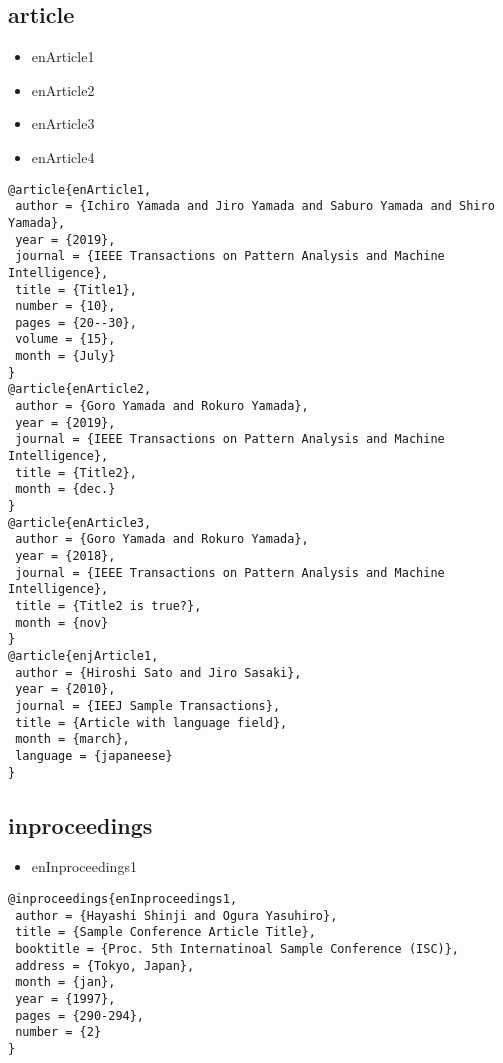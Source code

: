 \documentclass[9pt, twocolumn, a4paper]{jsarticle}
\begin{document}
\begin{bibunit}[jIEEEtran]

\subsection{article}

\begin{itemize}
  \item enArticle1 \cite{enArticle1}
  \item enArticle2 \cite{enArticle2}
  \item enArticle3 \cite{enArticle3}
  \item enArticle4 \cite{enArticle4}
\end{itemize}

\begin{lstlisting}
@article{enArticle1,
 author = {Ichiro Yamada and Jiro Yamada and Saburo Yamada and Shiro Yamada},
 year = {2019},
 journal = {IEEE Transactions on Pattern Analysis and Machine Intelligence},
 title = {Title1},
 number = {10},
 pages = {20--30},
 volume = {15},
 month = {July}
}
@article{enArticle2,
 author = {Goro Yamada and Rokuro Yamada},
 year = {2019},
 journal = {IEEE Transactions on Pattern Analysis and Machine Intelligence},
 title = {Title2},
 month = {dec.}
}
@article{enArticle3,
 author = {Goro Yamada and Rokuro Yamada},
 year = {2018},
 journal = {IEEE Transactions on Pattern Analysis and Machine Intelligence},
 title = {Title2 is true?},
 month = {nov}
}
@article{enjArticle1,
 author = {Hiroshi Sato and Jiro Sasaki},
 year = {2010},
 journal = {IEEJ Sample Transactions},
 title = {Article with language field},
 month = {march},
 language = {japaneese}
}
\end{lstlisting}

\subsection{inproceedings}

\begin{itemize}
  \item enInproceedings1 \cite{enInproceedings1}
\end{itemize}

\begin{lstlisting}
@inproceedings{enInproceedings1,
 author = {Hayashi Shinji and Ogura Yasuhiro},
 title = {Sample Conference Article Title},
 booktitle = {Proc. 5th Internatinoal Sample Conference (ISC)},
 address = {Tokyo, Japan},
 month = {jan},
 year = {1997},
 pages = {290-294},
 number = {2}
}
\end{lstlisting}


\end{bibunit}
\end{document}
